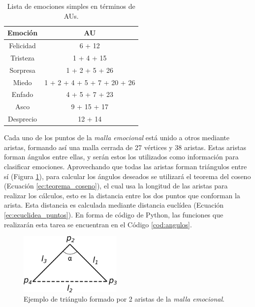 \begin{table}[H]
\begin{center}
\begin{tabular}{|c|c|}
     \hline
    \textbf{Emoción} & \textbf{AU} \\
    \hline
     Felicidad & 6 + 12\\ 
     Tristeza & 1 + 4 + 15 \\ 
     Sorpresa & 1 + 2 + 5 + 26 \\
     Miedo & 1 + 2 + 4 + 5 + 7 + 20 + 26\\
     Enfado & 4 + 5 + 7 + 23 \\ 
     Asco & 9 + 15 + 17 \\
     Desprecio & 12 + 14 \\
     \hline
 \end{tabular}
 \captionsetup{justification=centering}
\caption{Lista de emociones simples en términos de AUs.}
\label{cuadro:emfacs}
\end{center}
\end{table}

Cada uno de los puntos de la \textit{malla emocional} está unido a otros mediante aristas, formando así una malla cerrada de 27 vértices y 38 aristas. Estas aristas forman ángulos entre ellas, y serán estos los utilizados como información para clasificar emociones. Aprovechando que todas las aristas forman triángulos entre sí (Figura \ref{fig:triangulo}), para calcular los ángulos deseados se utilizará el teorema del coseno (Ecuación \ref{ec:teorema_coseno}), el cual usa la longitud de las aristas para realizar los cálculos, esto es la distancia entre los dos puntos que conforman la arista. Esta distancia es calculada mediante distancia euclídea (Ecuación \ref{ec:ecuclidea_puntos}). En forma de código de Python, las funciones que realizarán esta tarea se encuentran en el Código \ref{cod:angulos}.

\begin{figure} [h!]
  \begin{center}
    \includegraphics[width=5cm]{figs/triangulo.png}
  \end{center}
  \captionsetup{justification=centering}
  \caption{Ejemplo de triángulo formado por 2 aristas de la \textit{malla emocional}.}
  \label{fig:triangulo}
\end{figure}


